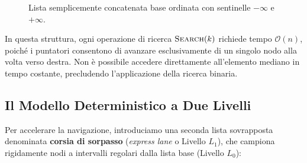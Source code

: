\begin{figure}[htbp]
\centering
{}
\caption{Lista semplicemente concatenata base ordinata con sentinelle $-\infty$ e $+\infty$.}
\label{fig:base-linked-list}
\end{figure}

In questa struttura, ogni operazione di ricerca $\textsc{Search}(k)$ richiede tempo $\mathcal{O}(n)$, poiché i puntatori consentono di avanzare esclusivamente di un singolo nodo alla volta verso destra. Non è possibile accedere direttamente all'elemento mediano in tempo costante, precludendo l'applicazione della ricerca binaria.

\subsection{Il Modello Deterministico a Due Livelli}
Per accelerare la navigazione, introduciamo una seconda lista sovrapposta denominata \textbf{corsia di sorpasso} (\textit{express lane} o Livello $L_1$), che campiona rigidamente nodi a intervalli regolari dalla lista base (Livello $L_0$):

